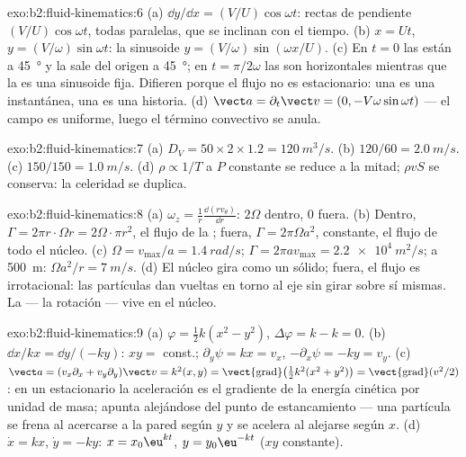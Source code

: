 \begin{solution}{exo:b2:fluid-kinematics:6}
(a) $\dd y/\dd x = (V/U)\cos\omega t$: rectas de pendiente
$(V/U)\cos\omega t$, todas paralelas, que se inclinan con el tiempo. (b) $x = Ut$, $y =
(V/\omega)\sin\omega t$: la sinusoide $y = (V/\omega)\sin(\omega x/U)$. (c) En
$t = 0$ las  están a \qty{45}{\degree} y la 
sale del origen a \qty{45}{\degree}; en $t = \pi/2\omega$ las  son horizontales mientras que la  es una sinusoide
fija. Difieren porque el flujo no es estacionario: una 
es una instantánea, una  es una historia.
(d) $\vect a = \partial_t\vect v = (0, -V\omega\sin\omega t)$ --- el campo es
uniforme, luego el término convectivo se anula.
\end{solution}

\begin{solution}{exo:b2:fluid-kinematics:7}
(a) $D_V = 50 \times 2 \times 1.2 = \qty{120}{m^3/s}$. (b) $120/60 = \qty{2.0}{m/s}$.
(c) $150/150 = \qty{1.0}{m/s}$. (d) $\rho \propto 1/T$ a $P$ constante se reduce
a la mitad; $\rho vS$ se conserva: la celeridad se duplica.
\end{solution}

\begin{solution}{exo:b2:fluid-kinematics:8}
(a) $\omega_z = \frac1r\frac{\dd(rv_\theta)}{\dd r}$: $2\Omega$ dentro, $0$
fuera. (b) Dentro, $\Gamma = 2\pi r\cdot\Omega r = 2\Omega\cdot\pi r^2$, el flujo
de la ; fuera, $\Gamma = 2\pi\Omega a^2$, constante, el flujo de
todo el núcleo. (c) $\Omega = v_{\max}/a = \qty{1.4}{rad/s}$; $\Gamma = 2\pi av_{\max}
= \qty{2.2e4}{m^2/s}$; a \qty{500}{m}: $\Omega a^2/r = \qty{7}{m/s}$. (d) El
núcleo gira como un sólido; fuera, el flujo es irrotacional: las partículas
dan vueltas en torno al eje sin girar sobre sí mismas. La  ---
la rotación --- vive en el núcleo.
\end{solution}

\begin{solution}{exo:b2:fluid-kinematics:9}
(a) $\varphi = \tfrac12k(x^2 - y^2)$, $\Delta\varphi = k - k = 0$. (b) $\dd x/
kx = \dd y/(-ky)$: $xy = $ const.; $\partial_y\psi = kx = v_x$, $-\partial_x\psi =
-ky = v_y$. (c) $\vect a = (v_x\partial_x + v_y\partial_y)\vect v = k^2(x, y) =
\operatorname{\vect{grad}}\bigl(\tfrac12k^2(x^2 + y^2)\bigr) = \operatorname{\vect{grad}}
(v^2/2)$: en un  estacionario la aceleración es el
gradiente de la energía cinética por unidad de masa; apunta alejándose del
punto de estancamiento --- una partícula se frena al acercarse a la pared
según $y$ y se acelera al alejarse según $x$. (d) $\dot x = kx$, $\dot y = -ky$:
$x = x_0\eu^{kt}$, $y = y_0\eu^{-kt}$ ($xy$ constante).
\end{solution}

